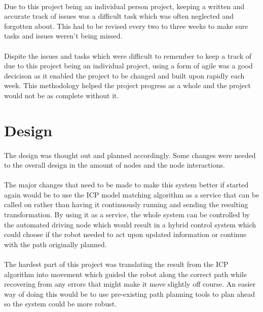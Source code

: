 \paragraph{}
Due to this project being an individual person project, keeping a written and accurate track of issues was a difficult task which was often neglected and forgotten about. This had to be revised every two to three weeks to make sure tasks and issues weren't being missed.

\paragraph{}
Dispite the issues and tasks which were difficult to remember to keep a track of due to this project being an individual project, using a form of agile was a good decicison as it enabled the project to be changed and built upon rapidly each week. This methodology helped the project progress as a whole and the project would not be as complete without it.

\section{Design}
\paragraph{}
The design was thought out and planned accordingly. Some changes were needed to the overall design in the amount of nodes and the node interactions.

\paragraph{}
The major changes that need to be made to make this system better if started again would be to use the ICP model matching algorithm as a service that can be called on rather than having it continuously running and sending the resulting transformation. By using it as a service, the whole system can be controlled by the automated driving node which would result in a hybrid control system which could choose if the robot needed to act upon updated information or continue with the path originally planned.

\paragraph{}
The hardest part of this project was translating the result from the ICP algorithm into movement which guided the robot along the correct path while recovering from any errors that might make it move slightly off course. An easier way of doing this would be to use pre-existing path planning tools to plan ahead so the system could be more robust.

